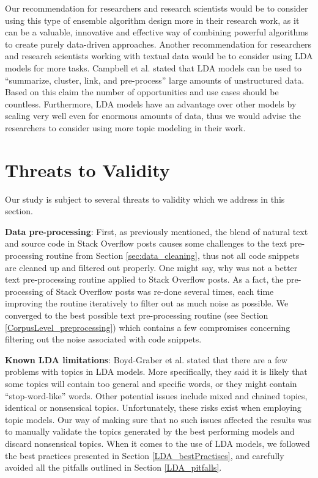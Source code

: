             Our recommendation for researchers and research scientists would be to consider using this type of ensemble algorithm design more in their research work, as it can be a valuable, innovative and effective way of combining powerful algorithms to create purely data-driven approaches. Another recommendation for researchers and research scientists working with textual data would be to consider using LDA models for more tasks. Campbell et al. \cite{campbell2015latent} stated that LDA models can be used to ``summarize, cluster, link, and pre-process'' large amounts of unstructured data. Based on this claim the number of opportunities and use cases should be countless. Furthermore, LDA models have an advantage over other models by scaling very well even for enormous amounts of data, thus we would advise the researchers to consider using more topic modeling in their work.
        
    \section{Threats to Validity\label{sec:validity}}
    
        Our study is subject to several threats to validity which we address in this section.
        
        \textbf{Data pre-processing}:  First, as previously mentioned, the blend of natural text and source code in Stack Overflow posts causes some challenges to the text pre-processing routine from Section \ref{sec:data_cleaning}, thus not all code snippets are cleaned up and filtered out properly. One might say, why was not a better text pre-processing routine applied to Stack Overflow posts. As a fact, the pre-processing of Stack Overflow posts was re-done several times, each time improving the routine iteratively to filter out as much noise as possible. We converged to the best possible text pre-processing routine (see Section \ref{CorpusLevel_preprocessing}) which contains a few compromises concerning filtering out the noise associated with code snippets.
        
        \textbf{Known LDA limitations}: Boyd-Graber et al. \cite{boyd2014care} stated that there are a few problems with topics in LDA models. More specifically, they said it is likely that some topics will contain too general and specific words, or they might contain ``stop-word-like'' words. Other potential issues include mixed and chained topics, identical or nonsensical topics. Unfortunately, these risks exist when employing topic models. Our way of making sure that no such issues affected the results was to manually validate the topics generated by the best performing models and discard nonsensical topics. When it comes to the use of LDA models, we followed the best practices presented in Section \ref{LDA_bestPractises}, and carefully avoided all the pitfalls outlined in Section \ref{LDA_pitfalls}.
        
